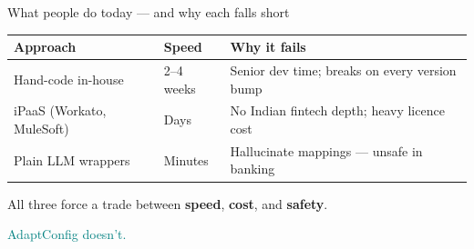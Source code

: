 \documentclass[aspectratio=169,11pt]{beamer}
\begin{document}
\begin{frame}{What people do today --- and why each falls short}
\vspace{0.4em}
\begin{center}
{\small
\begin{tabular}{lll}
\toprule
\textbf{Approach} & \textbf{Speed} & \textbf{Why it fails} \\
\midrule
Hand-code in-house & 2--4 weeks & Senior dev time; breaks on every version bump \\
iPaaS (Workato, MuleSoft) & Days & \textcolor{err}{No Indian fintech depth}; heavy licence cost \\
Plain LLM wrappers & Minutes & \textcolor{err}{Hallucinate mappings} --- unsafe in banking \\
\bottomrule
\end{tabular}
}
\end{center}

\vspace{0.8em}
\begin{center}
{\large All three force a trade between \textbf{speed}, \textbf{cost}, and \textbf{safety}.}

\vspace{0.4em}
{\Large \textcolor{teal}{AdaptConfig doesn't.}}
\end{center}
\end{frame}
\end{document}
